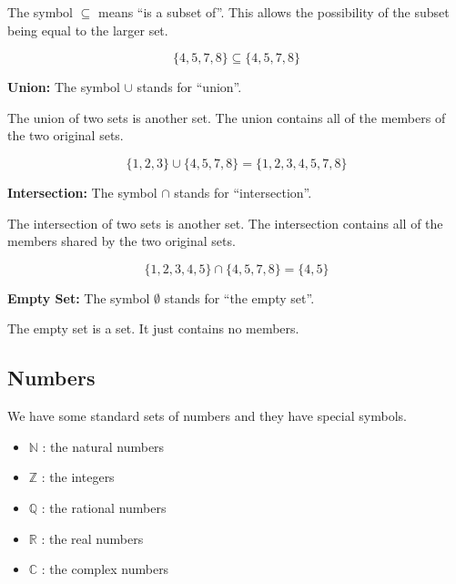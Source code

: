 \documentclass{ximera}
\begin{document}
The symbol $\subseteq$ means ``is a subset of''.  This allows the possibility of the subset being equal to the larger set.

\[
\{ 4, 5, 7, 8 \} \subseteq \{ 4, 5, 7, 8 \}
\]









\textbf{\textcolor{blue!55!black}{Union:}}  The symbol $\cup$ stands for ``union''.


The union of two sets is another set.  The union contains all of the members of the two original sets.

\[
\{ 1, 2, 3 \} \cup \{ 4, 5, 7, 8 \} = \{ 1, 2, 3, 4, 5, 7, 8 \}
\]








\textbf{\textcolor{blue!55!black}{Intersection:}}  The symbol $\cap$ stands for ``intersection''.

The intersection of two sets is another set.  The intersection contains all of the members shared by the two original sets.

\[
\{ 1, 2, 3, 4, 5 \} \cap \{ 4, 5, 7, 8 \} = \{ 4, 5 \}
\]








\textbf{\textcolor{blue!55!black}{Empty Set:}}  The symbol $\emptyset$ stands for ``the empty set''.

The empty set is a set.  It just contains no members.














\subsection*{Numbers}

We have some standard sets of numbers and they have special symbols. \\



\begin{itemize}

\item $\mathbb{N}$ : the natural numbers
\item $\mathbb{Z}$ : the integers
\item $\mathbb{Q}$ : the rational numbers
\item $\mathbb{R}$ : the real numbers
\item $\mathbb{C}$ : the complex numbers
\end{itemize}
\end{document}
